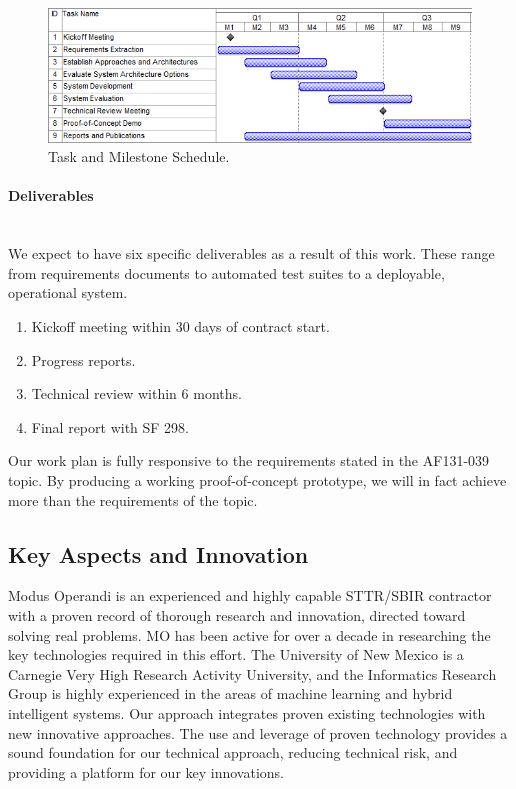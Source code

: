 \documentclass{sbir}
\begin{document}
\begin{figure}[h]
 \centerline{\includegraphics[width=5in]{./images/Gantt.png}}
 \caption{Task and Milestone Schedule.}
 \label{Gantt}
\end{figure}

\paragraph{Deliverables}~\\
We expect to have six specific deliverables as a result of this work.  These range from requirements documents to automated test suites to a deployable, operational system.
\begin{enumerate}
\item Kickoff meeting within 30 days of contract start.
\item Progress reports.
\item Technical review within 6 months.
\item Final report with SF 298.
\end{enumerate}

Our work plan is fully responsive to the requirements stated in the AF131-039 topic. By producing a working proof-of-concept prototype, we will in fact achieve more than the requirements of the topic.

\newpage
\pagestyle{proprietary}

\subsection{Key Aspects and Innovation}
Modus Operandi is an experienced and highly capable STTR/SBIR contractor with a proven record of thorough research and innovation, directed toward solving real problems. MO has been active for over a decade in researching the key technologies required in this effort. The University of New Mexico is a Carnegie Very High Research Activity University, and the Informatics Research Group is highly experienced in the areas of machine learning and hybrid intelligent systems. Our approach integrates proven existing technologies with new innovative approaches. The use and leverage of proven technology provides a sound foundation for our technical approach, reducing technical risk, and providing a platform for our key innovations.
\end{document}
